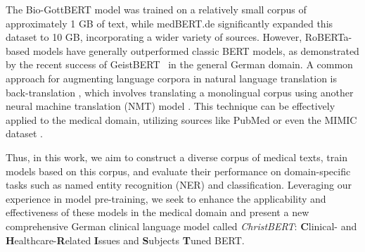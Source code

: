 The Bio-GottBERT model was trained on a relatively small corpus of approximately
1 GB of text, while medBERT.de significantly expanded this dataset to 10 GB,
incorporating a wider variety of sources. However, RoBERTa-based models have
generally outperformed classic BERT models, as demonstrated by the recent
success of GeistBERT~\cite{} in the general German domain. A common approach for
augmenting language corpora in natural language translation is back-translation
\cite{edunov2018understanding}, which involves translating a monolingual corpus
using another neural machine translation (NMT) model \cite{ng2019facebook}. This
technique can be effectively applied to the medical domain, utilizing sources
like PubMed or even the MIMIC dataset \cite{johnson2023mimic}.

Thus, in this work, we aim to construct a diverse corpus of medical texts, train
models based on this corpus, and evaluate their performance on domain-specific
tasks such as named entity recognition (NER) and classification. Leveraging our
experience in model pre-training, we seek to enhance the applicability and
effectiveness of these models in the medical domain and present  a new
comprehensive German clinical language model called \textit{ChristBERT}:
\textbf{C}linical- and \textbf{H}ealthcare-\textbf{R}elated \textbf{I}ssues and
\textbf{S}ubjects \textbf{T}uned BERT.
